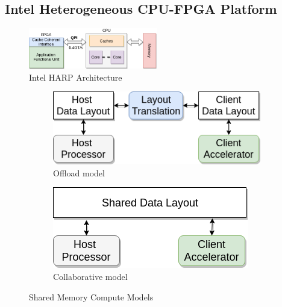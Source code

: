 \subsection{Intel Heterogeneous CPU-FPGA Platform}

\begin{figure}[htbp]
\centering
\includegraphics[width=0.5\textwidth]{figures/harp_arch}
\caption{Intel HARP Architecture}
\label{fig:harp_arch}
\end{figure}

\begin{figure}
\centering
\begin{subfigure}{0.4\textwidth}
    \includegraphics[width=\textwidth]{figures/offload_model}
    \caption{Offload model}
    \label{fig:offload_model}
\end{subfigure}
\hfill
\begin{subfigure}{0.4\textwidth}
    \includegraphics[width=\textwidth]{figures/collaborative_model}
    \caption{Collaborative model}
    \label{fig:collaborative_model}
\end{subfigure}
\caption{Shared Memory Compute Models}
\label{fig:compute_model}
\end{figure}

